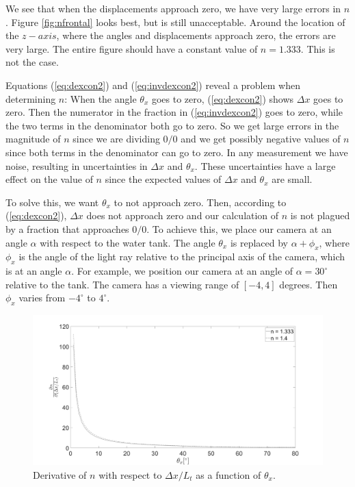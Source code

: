 \documentclass{article}
\begin{document}
We see that when the displacements approach zero, we have very large errors in $n$. Figure \ref{fig:nfrontal} looks best, but is still unacceptable. Around the location of the $z-axis$, where the angles and displacements approach zero, the errors are very large. The entire figure should have a constant value of $n = 1.333$. This is not the case.
 
Equations (\ref{eq:dexcon2}) and (\ref{eq:invdexcon2}) reveal a problem when determining $n$: When the angle $\theta_x$ goes to zero, (\ref{eq:dexcon2}) shows $\Delta x$ goes to zero. Then the numerator in the fraction in (\ref{eq:invdexcon2}) goes to zero, while the two terms in the denominator both go to zero. So we get large errors in the magnitude of $n$ since we are dividing $0/0$ and we get possibly negative values of $n$ since both terms in the denominator can go to zero. In any measurement we have noise, resulting in uncertainties in $\Delta x$ and $\theta_x$. These uncertainties have a large effect on the value of $n$ since the expected values of $\Delta x$ and $\theta_x$ are small. %

To solve this, we want $\theta_x$ to not approach zero. Then, according to (\ref{eq:dexcon2}), $\Delta x$ does not approach zero and our calculation of $n$ is not plagued by a fraction that approaches $0/0$. To achieve this, we place our camera at an angle $\alpha$ with respect to the water tank. The angle $\theta_x$ is replaced by $\alpha+\phi_x$, where $\phi_x$ is the angle of the light ray relative to the principal axis of the camera, which is at an angle $\alpha$. For example, we position our camera at an angle of $\alpha=30^\circ$ relative to the tank. The camera has a viewing range of $[-4,4]$ degrees. Then $\phi_x$ varies from $-4^\circ$ to $4^\circ$.

\begin{figure}[hpbt]
	\includegraphics[width=\textwidth, keepaspectratio]{dndx.png}
	\caption{Derivative of $n$ with respect to $\Delta x / L_t$ as a function of $\theta_x$.}	
	\label{fig:dndx}
\end{figure}
\end{document}
